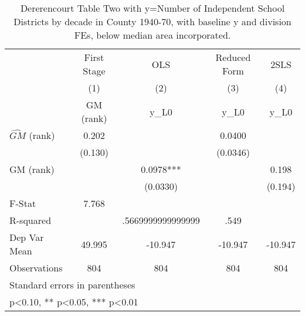 \begin{table}[htbp]\centering
\def\sym#1{\ifmmode^{#1}\else\(^{#1}\)\fi}
\caption{Dererencourt Table Two with y=Number of Independent School Districts by decade in County 1940-70, with baseline y and division FEs, below median area incorporated.}
\begin{tabular}{l*{4}{c}}
\toprule
                    & First Stage   &         OLS   &Reduced Form   &        2SLS   \\
                    &\multicolumn{1}{c}{(1)}&\multicolumn{1}{c}{(2)}&\multicolumn{1}{c}{(3)}&\multicolumn{1}{c}{(4)}\\
                    &\multicolumn{1}{c}{GM  (rank)}&\multicolumn{1}{c}{y\_L0}&\multicolumn{1}{c}{y\_L0}&\multicolumn{1}{c}{y\_L0}\\
\midrule
$\hat{GM}$ (rank)   &       0.202   &               &      0.0400   &               \\
                    &     (0.130)   &               &    (0.0346)   &               \\
\addlinespace
GM  (rank)          &               &      0.0978***&               &       0.198   \\
                    &               &    (0.0330)   &               &     (0.194)   \\
\midrule
F-Stat              &       7.768   &               &               &               \\
R-squared           &               &.5669999999999999   &        .549   &               \\
Dep Var Mean        &      49.995   &     -10.947   &     -10.947   &     -10.947   \\
Observations        &         804   &         804   &         804   &         804   \\
\bottomrule
\multicolumn{5}{l}{\footnotesize Standard errors in parentheses}\\
\multicolumn{5}{l}{\footnotesize * p<0.10, ** p<0.05, *** p<0.01}\\
\end{tabular}
\end{table}
